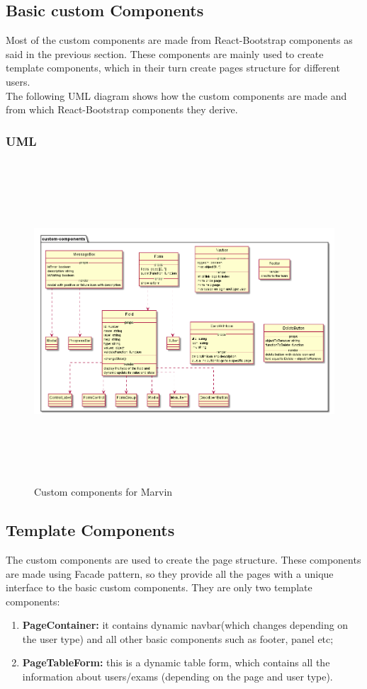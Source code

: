 \documentclass[../react]{subfiles}
\begin{document}
	\subsection{Basic custom Components} Most of the custom components are made from React-Bootstrap components as said in the previous section. These components are mainly used to create template components, which in their turn create pages structure for different users. \\The following UML diagram shows how the custom components are made and from which React-Bootstrap components they derive.  
	\\ 
		\subsubsection{UML}
			\begin{figure}[h]
			\centering
			\includegraphics[width=15.5cm,height=12cm]{"diagrammi/react/customComponents"}
			\caption{Custom components for Marvin}
			\label{fig:Custom components for Marvin}
		\end{figure}
	\subsection{Template Components} The custom components are used to create the page structure. These components are made using Facade pattern, so 
	they provide all the pages with a unique interface to the basic custom components. They are only two template components: \begin{enumerate}
		\item \textbf{PageContainer: } it contains dynamic navbar(which changes depending on the user type) and all other basic components such as footer, panel etc;
		\item \textbf{PageTableForm: }this is a dynamic table form, which contains all the information about users/exams (depending on the page and user type).
	\end{enumerate} 
\end{document}
